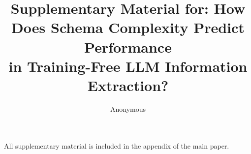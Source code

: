 \documentclass[11pt]{article}
\title{Supplementary Material for: How Does Schema Complexity Predict Performance\\in Training-Free LLM Information Extraction?}
\author{Anonymous}
\begin{document}
\maketitle

All supplementary material is included in the appendix of the main paper.
\end{document}

